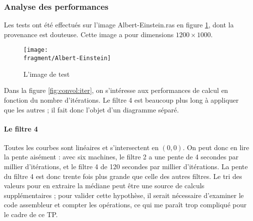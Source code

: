 \subsubsection{Analyse des performances}

Les tests ont été effectués sur l'image Albert-Einstein.ras en figure
\ref{fig:convol:einstein}, dont la provenance est douteuse. Cette
image a pour dimensions $1200 \times 1000$.

\begin{figure}
  \centering
  \texttt{[image: \\fragment/Albert-Einstein]}
  \caption{L'image de test}
  \label{fig:convol:einstein}
\end{figure}

Dans la figure \ref{fig:convol:iter}, on s'intéresse aux performances
de calcul en fonction du nombre d'itérations. Le filtre 4 est beaucoup
plus long à appliquer que les autres ; il fait donc l'objet d'un
diagramme séparé.

\paragraph{Le filtre 4}
Toutes les courbes sont linéaires et s'intersectent en $(0, 0)$. On
peut donc en lire la pente aisément : avec six machines, le filtre 2
a une pente de 4 secondes par millier d'itérations, et le filtre 4 de
120 secondes par millier d'itérations. La pente du filtre 4 est donc
trente fois plus grande que celle des autres filtres. Le tri des
valeurs pour en extraire la médiane peut être une source de calculs
supplémentaires ; pour valider cette hypothèse, il serait nécessaire
d'examiner le code assembleur et compter les opérations, ce qui me
paraît trop compliqué pour le cadre de ce TP.

